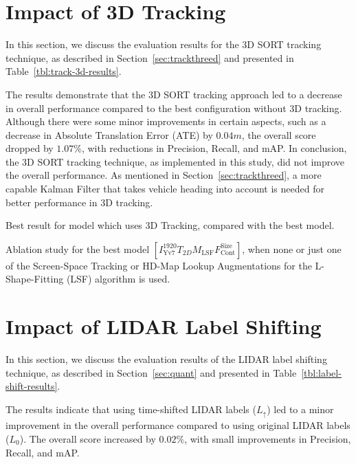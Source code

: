 \section{Impact of 3D Tracking}
\label{sec:impacttracking}

In this section, we discuss the evaluation results for the 3D SORT tracking technique, as described in Section~\ref{sec:trackthreed} and presented in Table~\ref{tbl:track-3d-results}.

The results demonstrate that the 3D SORT tracking approach led to a decrease in overall performance compared to the best configuration without 3D tracking.
Although there were some minor improvements in certain aspects, such as a decrease in Absolute Translation Error (ATE) by $0.04m$, the overall score dropped by $1.07\%$, with reductions in Precision, Recall, and mAP.
In conclusion, the 3D SORT tracking technique, as implemented in this study, did not improve the overall performance.
As mentioned in Section~\ref{sec:trackthreed}, a more capable Kalman Filter that takes vehicle heading into account is needed for better performance in 3D tracking.

\begin{table}[h!]
    
    \caption{Best result for model which uses 3D Tracking, compared with the best model.}
    \label{tbl:track-3d-results}
\end{table}

\begin{table}[h!]
    
    \caption{Ablation study for the best model $\left[I^{1920}_\text{Yv7}T_{2D}M_\text{LSF}F_\text{Cont}^\text{Size}\right]$, when none or just one of the Screen-Space Tracking or HD-Map Lookup Augmentations for the L-Shape-Fitting (LSF) algorithm is used.}
    \label{tbl:lsf-results}
\end{table}

\section{Impact of LIDAR Label Shifting}
\label{sec:impactlidar}

In this section, we discuss the evaluation results of the LIDAR label shifting technique, as described in Section~\ref{sec:quant} and presented in Table~\ref{tbl:label-shift-results}.

The results indicate that using time-shifted LIDAR labels ($L_{\uparrow}$) led to a minor improvement in the overall performance compared to using original LIDAR labels ($L_0$).
The overall score increased by $0.02\%$, with small improvements in Precision, Recall, and mAP.

